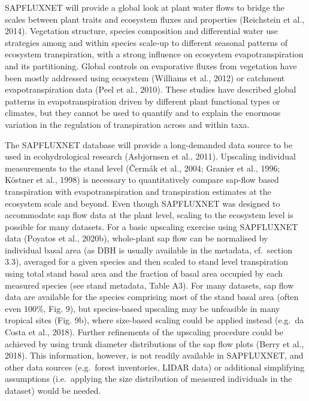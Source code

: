 \documentclass[11pt,twoside]{reedthesis}
\begin{document}
SAPFLUXNET will provide a global look at plant water flows to bridge the
scales between plant traits and ecosystem fluxes and properties
(Reichstein et al., 2014). Vegetation structure, species composition and
differential water use strategies among and within species scale-up to
different seasonal patterns of ecosystem transpiration, with a strong
influence on ecosystem evapotranspiration and its partitioning. Global
controls on evaporative fluxes from vegetation have been mostly
addressed using ecosystem (Williams et al., 2012) or catchment
evapotranspiration data (Peel et al., 2010). These studies have
described global patterns in evapotranspiration driven by different
plant functional types or climates, but they cannot be used to quantify
and to explain the enormous variation in the regulation of transpiration
across and within taxa.\par

The SAPFLUXNET database will provide a long-demanded data source to be
used in ecohydrological research (Asbjornsen et al., 2011). Upscaling
individual measurements to the stand level (Čermák et al., 2004; Granier
et al., 1996; Köstner et al., 1998) is necessary to quantitatively
compare sap-flow based transpiration with evapotranspiration and
transpiration estimates at the ecosystem scale and beyond. Even though
SAPFLUXNET was designed to accommodate sap flow data at the plant level,
scaling to the ecosystem level is possible for many datasets. For a
basic upscaling exercise using SAPFLUXNET data (Poyatos et al., 2020b),
whole-plant sap flow can be normalised by individual basal area (as DBH
is usually available in the metadata, cf.~section 3.3), averaged for a
given species and then scaled to stand level transpiration using total
stand basal area and the fraction of basal area occupied by each
measured species (see stand metadata, Table A3). For many datasets, sap
flow data are available for the species comprising most of the stand
basal area (often even 100\%, Fig. 9), but species-based upscaling may
be unfeasible in many tropical sites (Fig. 9b), where size-based scaling
could be applied instead (e.g.~da Costa et al., 2018). Further
refinements of the upscaling procedure could be achieved by using trunk
diameter distributions of the sap flow plots (Berry et al., 2018). This
information, however, is not readily available in SAPFLUXNET, and other
data sources (e.g.~forest inventories, LIDAR data) or additional
simplifying assumptions (i.e.~applying the size distribution of measured
individuals in the dataset) would be needed.\par
\end{document}
